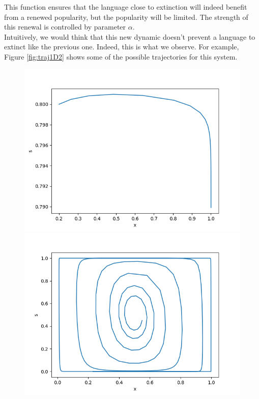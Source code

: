 \documentclass{article}
\begin{document}
This function ensures that the language close to extinction will indeed benefit from a renewed popularity, but the popularity will be limited.
The strength of this renewal is controlled by parameter $\alpha$. \\
Intuitively, we would think that this new dynamic doesn't prevent a language to extinct like the previous one.
Indeed, this is what we observe.
For example, Figure \ref{fig:traj1D2} shows some of the possible trajectories for this system.

\begin{figure}
\centering
\includegraphics[scale=0.4]{traj1D202081e-3.png}
\includegraphics[scale=0.4]{traj1D20550451.png}

\end{figure}
\end{document}
